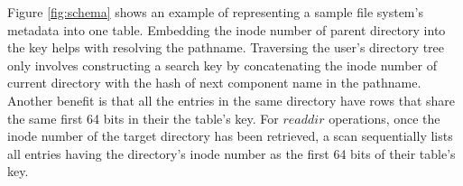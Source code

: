 Figure \ref{fig:schema} shows an example of representing
a sample file system's metadata into one table.
Embedding the inode number of parent directory into the key
helps with resolving the pathname.
Traversing the user's directory tree
only involves constructing a search key by concatenating the inode
number of current directory with the hash of
next component name in the pathname.
Another benefit is that all the entries in the same directory have rows that
share the same first 64 bits in their the table's key.
For $readdir$ operations, once the inode number
of the target directory has been retrieved,
a scan sequentially lists all entries having
the directory's inode number as the first 64 bits of their table's key.
